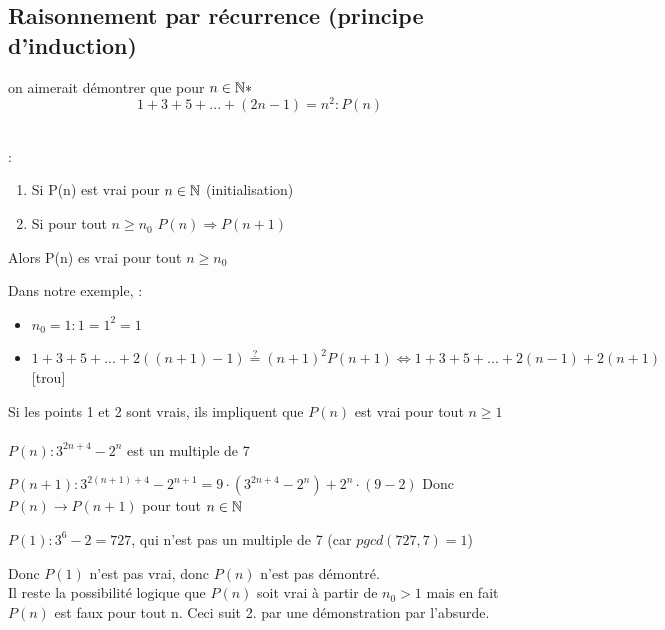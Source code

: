 \documentclass[12pt,a4paper]{article}
\begin{document}
\subsection{Raisonnement par récurrence (principe d'induction)}
{\setlength{\baselineskip}{3pt}
 on aimerait démontrer que pour $n \in \mathbb{N}*$
\begin{equation}
1 + 3 + 5 +... + (2n-1) = n^2 : P(n)
\end{equation}\\
\begin{boite}
	\Theoreme:
	\begin{enumerate}
		\item Si P(n) est vrai pour $n \in \mathbb{N}$ (initialisation)	
		\item Si pour tout $n \geq n_0$ $P(n) \Rightarrow P(n+1)$
	\end{enumerate}
	Alors P(n) es vrai pour tout $n \geq n_0$
\end{boite}
\par}
Dans notre exemple, :
\begin{itemize}
	\item $n_0 = 1 : 1 = 1^2 = 1$
	\item $1+3+5+...+2((n+1)-1) \stackrel{?}{=} (n+1)^2 P(n+1) \iff 1+3+5+...+2(n-1) + 2(n+1) $[trou]
\end{itemize}
Si les points 1 et 2 sont vrais, ils impliquent que $P(n)$ est vrai pour tout $n \geq 1$\\
\\
$P(n) : 3^{2n + 4} - 2^n$ est un multiple de 7
\begin{etaremune}
	\item $P(n+1) : 3^{2(n+1)+4}-2^{n+1} = 9\cdot (3^{2n+4}-2^n)+2^n\cdot(9-2)$ Donc $P(n) \to P(n+1)$ pour tout $n \in \mathbb{N}$
	\item $P(1) : 3^6-2 = 727$, qui n'est pas un multiple de 7 (car $pgcd(727,7 )= 1$)
\end{etaremune}
Donc $P(1)$ n'est pas vrai, donc $P(n)$ n'est pas démontré.\\
Il reste la possibilité logique que $P(n)$ soit vrai à partir de $n_0 > 1$ mais en fait $P(n)$ est faux pour tout n. Ceci suit 2. par une démonstration par l'absurde.
\end{document}

